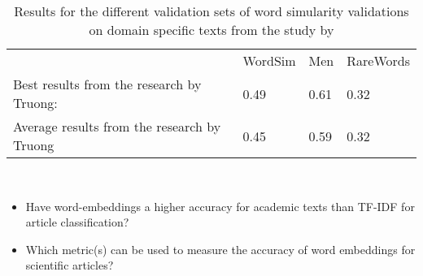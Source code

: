 \documentclass[../../Thesis.tex]{subfiles}
\begin{document}
\begin{table}[hbt]
\begin{center}
\begin{tabular}{l l l l}
&WordSim & Men & RareWords\\
Best results from the research by Truong: & 0.49 & 0.61 & 0.32\\
Average  results from the research by Truong & 0.45 & 0.59 & 0.32\\
\end{tabular}
\end{center}
\caption{Results for the different validation sets of word simularity validations on domain specific texts from the study by \citet{Truong2017Thesis}}\label{table:truongErrorRates}
\end{table}
\\
\begin{itemize}
\item{Have word-embeddings a higher accuracy for academic texts than TF-IDF for article classification?}
\item{Which metric(s) can be used to measure the accuracy of word embeddings for scientific articles?}
\end{itemize}
\end{document}
